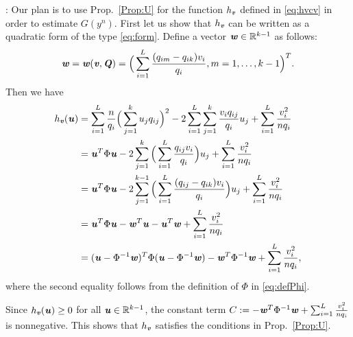 \documentclass[11pt,onecolumn]{IEEEtran}
\def\mathbi#1{{\textbf{\textit #1}}}
\begin{document}
:
Our plan is to use Prop.~\ref{Prop:U} for the function $h_{\mathbi{v}}$ defined in \eqref{eq:hvcv} in order to estimate $G(y^n).$
First let us show that $h_{\mathbi{v}}$ can be written as a quadratic form of the type \eqref{eq:form}.
Define a vector $\mathbi{w} \in \mathbb{R}^{k-1}$ as follows:
\begin{equation}\label{eq:defw}
\mathbi{w}=\mathbi{w}(\mathbi{v},\mathbi{Q})= \Big( \sum_{i=1}^L  \frac{
(q_{im}-q_{ik}) v_i  }{q_i}, m=1,\dots,k-1 \Big)^T.
\end{equation}
Then we have
   \begin{align}
h_{\mathbi{v}}(\mathbi{u}) & = \sum_{i=1}^L \frac{n}{q_i} \Big(\sum_{j=1}^k u_j q_{ij} \Big)^2
- 2 \sum_{i=1}^L  \sum_{j=1}^k   \frac{v_i q_{ij}}{q_i} u_j 
+ \sum_{i=1}^L \frac{ v_i^2}{nq_i}  \nonumber\\
& = \mathbi{u}^T \Phi \mathbi{u} - 2  \sum_{j=1}^k \Big(\sum_{i=1}^L  \frac{q_{ij} v_i }{q_i}\Big) u_j 
+ \sum_{i=1}^L \frac{ v_i^2}{nq_i} \nonumber\\
& = \mathbi{u}^T \Phi \mathbi{u} - 2  \sum_{j=1}^{k-1} \Big(\sum_{i=1}^L  \frac{
(q_{ij}-q_{ik}) v_i  }{q_i}\Big) u_j 
+ \sum_{i=1}^L \frac{ v_i^2}{nq_i} \nonumber\\
& = \mathbi{u}^T \Phi \mathbi{u} - \mathbi{w}^T \mathbi{u} - \mathbi{u}^T \mathbi{w}
+ \sum_{i=1}^L \frac{ v_i^2}{nq_i} \nonumber\\
& = (\mathbi{u} - \Phi^{-1}\mathbi{w})^T \Phi (\mathbi{u} - \Phi^{-1}\mathbi{w})
- \mathbi{w}^T \Phi^{-1} \mathbi{w} + \sum_{i=1}^L \frac{ v_i^2}{nq_i},\label{eq:hv}
\end{align}
where the second equality follows from the definition of $\Phi$ in \eqref{eq:defPhi}.

Since $h_{\mathbi{v}}(\mathbi{u}) \ge 0$ for all $\mathbi{u} \in \mathbb{R}^{k-1}$, the constant term
$C:=- \mathbi{w}^T \Phi^{-1} \mathbi{w} + \sum_{i=1}^L \frac{ v_i^2}{nq_i}$ is nonnegative. This shows that $h_{\mathbi{v}}$ satisfies the conditions in Prop.~\ref{Prop:U}.
\end{document}
